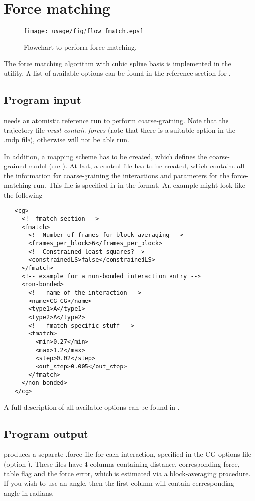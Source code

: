 \chapter{Force matching}
\begin{figure}
   \centering
   \texttt{[image: usage/fig/flow\_fmatch.eps]}
   \caption{Flowchart to perform force matching.}
\end{figure}
The force matching algorithm with cubic spline basis is implemented in the  utility. A list of available options can be found in the reference section for .

\section{Program input}
 needs an atomistic reference run to perform coarse-graining. Note that the trajectory file {\em must contain forces } (note that there is a suitable option in the \gromacs .mdp file), otherwise  will not be able run.

In addition, a mapping scheme has to be created, which defines the coarse-grained model (see ). At last, a control file has to be created, which contains all the information for coarse-graining the interactions and parameters for the force-matching run. This file is specified in  in the \xml format. An example might look like the following
\begin{lstlisting}
   <cg>
     <!--fmatch section -->
     <fmatch>
       <!--Number of frames for block averaging -->
       <frames_per_block>6</frames_per_block>
       <!--Constrained least squares?-->
       <constrainedLS>false</constrainedLS>
     </fmatch>
     <!-- example for a non-bonded interaction entry -->
     <non-bonded>
       <!-- name of the interaction -->
       <name>CG-CG</name>
       <type1>A</type1>
       <type2>A</type2>
       <!-- fmatch specific stuff -->
       <fmatch>
         <min>0.27</min>
         <max>1.2</max>
         <step>0.02</step>
         <out_step>0.005</out_step>
       </fmatch>
     </non-bonded>
   </cg>
\end{lstlisting}
A full description of all available options can be found in .

\section{Program output}
 produces a separate .force file for each interaction, specified in the CG-options file (option ).
These files have 4 columns containing distance, corresponding force, table flag and the force error, which is estimated via a block-averaging procedure.
If you wish to use an angle, then the first column will contain corresponding angle in radians.

